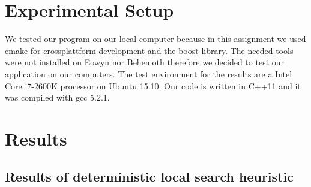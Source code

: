 \documentclass[11pt]{article}
\begin{document}
\section{Experimental Setup}
We tested our program on our local computer because in this assignment we used cmake for crossplattform development and the boost library.
The needed tools were not installed on Eowyn nor Behemoth therefore we decided to test our application on our computers.
The test environment for the results are a Intel Core i7-2600K processor on Ubuntu 15.10.
Our code is written in C++11 and it was compiled with gcc 5.2.1.

\newpage
\section{Results}
\subsection{Results of deterministic local search heuristic}
\end{document}
